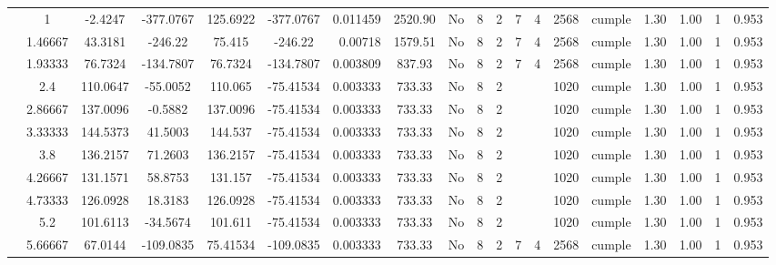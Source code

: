 \begin{table}[H]
{\begin{tabular}{|c|c|c|c|c|c|r|c|c|c|c|c|c|c|c|c|c|c|c|}
\cline{2-19}        & \cellcolor[rgb]{ .851,  .882,  .949}1 & -2.4247 & -377.0767 & 125.6922 & -377.0767 & 0.011459 & 2520.90 & No  & 8   & 2   & 7   & 4   & 2568 & \cellcolor[rgb]{ .776,  .937,  .808}cumple & 1.30 & 1.00 & 1   & 0.953 \bigstrut\\
\cline{2-19}        & 1.46667 & 43.3181 & -246.22 & 75.415 & -246.22 & 0.00718 & 1579.51 & No  & 8   & 2   & 7   & 4   & 2568 & \cellcolor[rgb]{ .776,  .937,  .808}cumple & 1.30 & 1.00 & 1   & 0.953 \bigstrut\\
\cline{2-19}        & 1.93333 & 76.7324 & -134.7807 & 76.7324 & -134.7807 & 0.003809 & 837.93 & No  & 8   & 2   & 7   & 4   & 2568 & \cellcolor[rgb]{ .776,  .937,  .808}cumple & 1.30 & 1.00 & 1   & 0.953 \bigstrut\\
\cline{2-19}        & 2.4 & 110.0647 & -55.0052 & 110.065 & -75.41534 & 0.003333 & 733.33 & No  & 8   & 2   &     &     & 1020 & \cellcolor[rgb]{ .776,  .937,  .808}cumple & 1.30 & 1.00 & 1   & 0.953 \bigstrut\\
\cline{2-19}        & 2.86667 & 137.0096 & -0.5882 & 137.0096 & -75.41534 & 0.003333 & 733.33 & No  & 8   & 2   &     &     & 1020 & \cellcolor[rgb]{ .776,  .937,  .808}cumple & 1.30 & 1.00 & 1   & 0.953 \bigstrut\\
\cline{2-19}        & 3.33333 & 144.5373 & 41.5003 & 144.537 & -75.41534 & 0.003333 & 733.33 & No  & 8   & 2   &     &     & 1020 & \cellcolor[rgb]{ .776,  .937,  .808}cumple & 1.30 & 1.00 & 1   & 0.953 \bigstrut\\
\cline{2-19}        & 3.8 & 136.2157 & 71.2603 & 136.2157 & -75.41534 & 0.003333 & 733.33 & No  & 8   & 2   &     &     & 1020 & \cellcolor[rgb]{ .776,  .937,  .808}cumple & 1.30 & 1.00 & 1   & 0.953 \bigstrut\\
\cline{2-19}        & 4.26667 & 131.1571 & 58.8753 & 131.157 & -75.41534 & 0.003333 & 733.33 & No  & 8   & 2   &     &     & 1020 & \cellcolor[rgb]{ .776,  .937,  .808}cumple & 1.30 & 1.00 & 1   & 0.953 \bigstrut\\
\cline{2-19}        & 4.73333 & 126.0928 & 18.3183 & 126.0928 & -75.41534 & 0.003333 & 733.33 & No  & 8   & 2   &     &     & 1020 & \cellcolor[rgb]{ .776,  .937,  .808}cumple & 1.30 & 1.00 & 1   & 0.953 \bigstrut\\
\cline{2-19}        & 5.2 & 101.6113 & -34.5674 & 101.611 & -75.41534 & 0.003333 & 733.33 & No  & 8   & 2   &     &     & 1020 & \cellcolor[rgb]{ .776,  .937,  .808}cumple & 1.30 & 1.00 & 1   & 0.953 \bigstrut\\
\cline{2-19}        & 5.66667 & 67.0144 & -109.0835 & 75.41534 & -109.0835 & 0.003333 & 733.33 & No  & 8   & 2   & 7   & 4   & 2568 & \cellcolor[rgb]{ .776,  .937,  .808}cumple & 1.30 & 1.00 & 1   & 0.953 \bigstrut\\

\end{tabular}}
\end{table}
